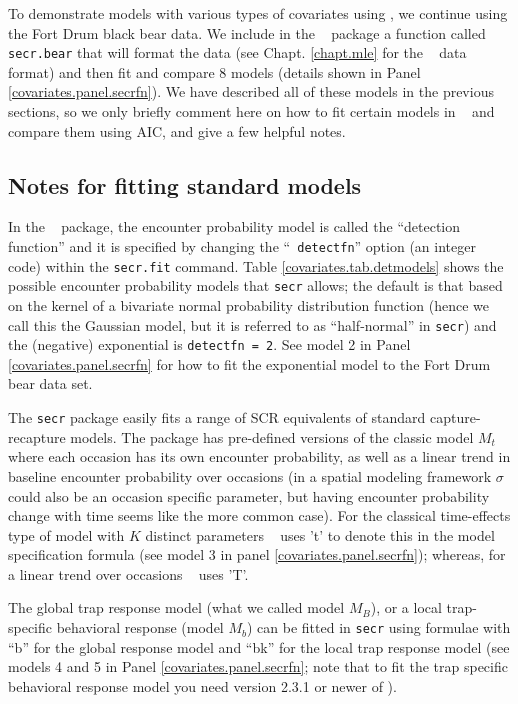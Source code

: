 To demonstrate
 models with various types of covariates using \secr, we
continue using the Fort Drum black bear data. 
We include in the \scrbook~ package a function called {\tt secr.bear}
that will format the data (see Chapt. \ref{chapt.mle} for the \secr~
data format) and then fit and compare 8 models (details shown in Panel
\ref{covariates.panel.secrfn}).  We have described all of these
models in the previous sections, so we only briefly comment here on
how to fit certain models in \secr~ and compare them using AIC, and
give a few helpful notes.


\subsection{Notes for fitting standard models}

In the \secr~ package, the encounter probability model is called the
``detection function'' and it is specified by changing the ``\mbox{\tt
  detectfn}'' option (an integer code) within the \mbox{\tt secr.fit}
command.  Table \ref{covariates.tab.detmodels} shows the possible
encounter probability models that \mbox{\tt secr} allows; the default
is that based on the kernel of a bivariate normal probability
distribution function (hence we call this the Gaussian model, but it
is referred to as ``half-normal'' in \mbox{\tt secr}) and the
(negative) exponential is \mbox{\tt detectfn = 2}.  See model 2 in
Panel \ref{covariates.panel.secrfn} for how to fit the exponential
model to the Fort Drum bear data set.

The \mbox{\tt secr} package easily fits a range of SCR equivalents of
standard capture-recapture models.  The package has pre-defined
versions of the classic model $M_{t}$ where each occasion has its own
encounter probability, as well as a linear trend in baseline encounter
probability over occasions (in a spatial modeling framework $\sigma$
could also be an occasion specific parameter, but having encounter
probability change with time seems like the more common case). For the
classical time-effects type of model with $K$ distinct parameters
\secr~ uses 't' to denote this in the model specification formula (see
model 3 in panel \ref{covariates.panel.secrfn}); whereas, for a linear
trend over occasions \secr~ uses 'T'.

The global trap response model (what we called model $M_{B}$), or a
local trap-specific behavioral response (model $M_{b}$) can be fitted
in \mbox{\tt secr} using formulae with ``b'' for the global response
model and ``bk'' for the local trap response model (see models 4 and 5
in Panel \ref{covariates.panel.secrfn}; note that to fit the trap
specific behavioral response model you need version 2.3.1 or newer of
\secr).

